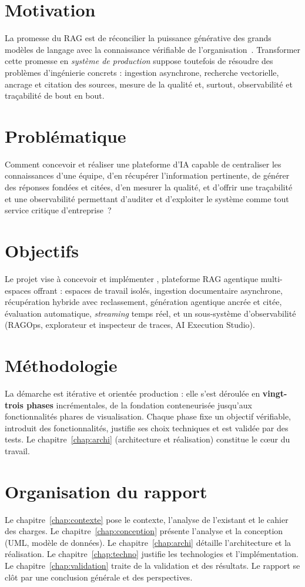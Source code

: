 \section*{Motivation}
La promesse du RAG est de réconcilier la puissance générative des grands modèles
de langage avec la connaissance vérifiable de l'organisation~\cite{lewis2020}.
Transformer cette promesse en \emph{système de production} suppose toutefois de
résoudre des problèmes d'ingénierie concrets : ingestion asynchrone, recherche
vectorielle, ancrage et citation des sources, mesure de la qualité et, surtout,
observabilité et traçabilité de bout en bout.

\section*{Problématique}
Comment concevoir et réaliser une plateforme d'IA capable de centraliser les
connaissances d'une équipe, d'en récupérer l'information pertinente, de générer
des réponses fondées et citées, d'en mesurer la qualité, et d'offrir une
traçabilité et une observabilité permettant d'auditer et d'exploiter le système
comme tout service critique d'entreprise~?

\section*{Objectifs}
Le projet vise à concevoir et implémenter \devpilot{}, plateforme RAG agentique
multi-espaces offrant : espaces de travail isolés, ingestion documentaire
asynchrone, récupération hybride avec reclassement, génération agentique ancrée
et citée, évaluation automatique, \emph{streaming} temps réel, et un sous-système
d'observabilité (RAGOps, explorateur et inspecteur de traces, AI Execution
Studio).

\section*{Méthodologie}
La démarche est itérative et orientée production : elle s'est déroulée en
\textbf{vingt-trois phases} incrémentales, de la fondation conteneurisée jusqu'aux
fonctionnalités phares de visualisation. Chaque phase fixe un objectif vérifiable,
introduit des fonctionnalités, justifie ses choix techniques et est validée par
des tests. Le chapitre~\ref{chap:archi} (architecture et réalisation) constitue
le c{\oe}ur du travail.

\section*{Organisation du rapport}
Le chapitre~\ref{chap:contexte} pose le contexte, l'analyse de l'existant et le
cahier des charges. Le chapitre~\ref{chap:conception} présente l'analyse et la
conception (UML, modèle de données). Le chapitre~\ref{chap:archi} détaille
l'architecture et la réalisation. Le chapitre~\ref{chap:techno} justifie les
technologies et l'implémentation. Le chapitre~\ref{chap:validation} traite de la
validation et des résultats. Le rapport se clôt par une conclusion générale et
des perspectives.
